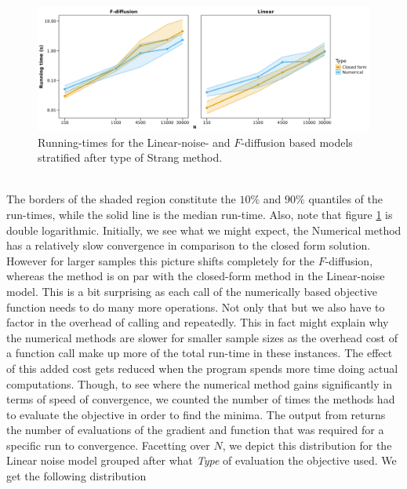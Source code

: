 \begin{figure}[h!]
    \begin{center}
    \includegraphics[scale = .1]{figures/Running_result_numeric.jpeg}
    \caption{Running-times for the Linear-noise- and $F$-diffusion based models stratified after type of Strang method.} 
    \label{figure:running_result_numeric}       
    \end{center}
\end{figure}\\
The borders of the shaded region constitute the $10\%$ and $90\%$ quantiles of the run-times, while the solid line is the median run-time. Also, note that figure \ref{figure:running_result_numeric} is double logarithmic. Initially, we see what we might expect, the Numerical method has a relatively slow convergence in comparison to the closed form solution. However for larger samples this picture shifts completely for the $F$-diffusion, whereas the method is on par with the closed-form method in the Linear-noise model. This is a bit surprising as each call of the numerically based objective function needs to do many more operations. Not only that but we also have to factor in the overhead of calling  and  repeatedly. This in fact might explain why the numerical methods are slower for smaller sample sizes as the overhead cost of a function call make up more of the total run-time in these instances. The effect of this added cost gets reduced when the program spends more time doing actual computations. Though, to see where the numerical method gains significantly in terms of speed of convergence, we counted the number of times the methods had to evaluate the objective in order to find the minima. The  output from  returns the number of evaluations of the gradient and function that was required for a specific run to convergence. Facetting over $N$, we depict this distribution for the Linear noise model grouped after what \textit{Type} of evaluation the objective used. We get the following distribution
